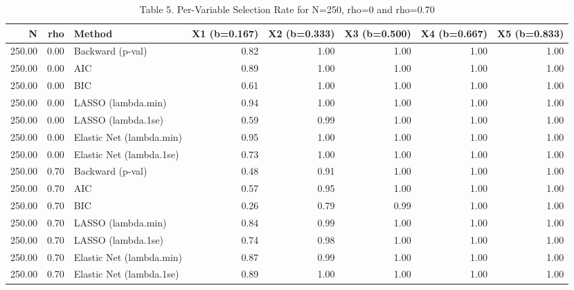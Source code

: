 \begin{table}[ht]
\centering
\caption{Table 5. Per-Variable Selection Rate for N=250, rho=0 and rho=0.70} 
\begin{tabular}{rrlrrrrr}
  \toprule
N & rho & Method & X1 (b=0.167) & X2 (b=0.333) & X3 (b=0.500) & X4 (b=0.667) & X5 (b=0.833) \\ 
  \midrule
250.00 & 0.00 & Backward (p-val) & 0.82 & 1.00 & 1.00 & 1.00 & 1.00 \\ 
  250.00 & 0.00 & AIC & 0.89 & 1.00 & 1.00 & 1.00 & 1.00 \\ 
  250.00 & 0.00 & BIC & 0.61 & 1.00 & 1.00 & 1.00 & 1.00 \\ 
  250.00 & 0.00 & LASSO (lambda.min) & 0.94 & 1.00 & 1.00 & 1.00 & 1.00 \\ 
  250.00 & 0.00 & LASSO (lambda.1se) & 0.59 & 0.99 & 1.00 & 1.00 & 1.00 \\ 
  250.00 & 0.00 & Elastic Net (lambda.min) & 0.95 & 1.00 & 1.00 & 1.00 & 1.00 \\ 
  250.00 & 0.00 & Elastic Net (lambda.1se) & 0.73 & 1.00 & 1.00 & 1.00 & 1.00 \\ 
  250.00 & 0.70 & Backward (p-val) & 0.48 & 0.91 & 1.00 & 1.00 & 1.00 \\ 
  250.00 & 0.70 & AIC & 0.57 & 0.95 & 1.00 & 1.00 & 1.00 \\ 
  250.00 & 0.70 & BIC & 0.26 & 0.79 & 0.99 & 1.00 & 1.00 \\ 
  250.00 & 0.70 & LASSO (lambda.min) & 0.84 & 0.99 & 1.00 & 1.00 & 1.00 \\ 
  250.00 & 0.70 & LASSO (lambda.1se) & 0.74 & 0.98 & 1.00 & 1.00 & 1.00 \\ 
  250.00 & 0.70 & Elastic Net (lambda.min) & 0.87 & 0.99 & 1.00 & 1.00 & 1.00 \\ 
  250.00 & 0.70 & Elastic Net (lambda.1se) & 0.89 & 1.00 & 1.00 & 1.00 & 1.00 \\ 
   \bottomrule
\end{tabular}
\end{table}
